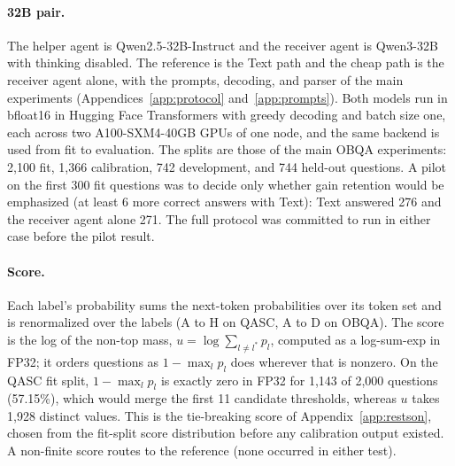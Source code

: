 \paragraph{32B pair.} The helper agent is Qwen2.5-32B-Instruct and the receiver agent is Qwen3-32B with thinking disabled. The reference is the Text path and the cheap path is the receiver agent alone, with the prompts, decoding, and parser of the main experiments (Appendices~\ref{app:protocol} and~\ref{app:prompts}). Both models run in bfloat16 in Hugging Face Transformers with greedy decoding and batch size one, each across two A100-SXM4-40GB GPUs of one node, and the same backend is used from fit to evaluation. The splits are those of the main OBQA experiments: 2,100 fit, 1,366 calibration, 742 development, and 744 held-out questions. A pilot on the first 300 fit questions was to decide only whether gain retention would be emphasized (at least 6 more correct answers with Text): Text answered 276 and the receiver agent alone 271. The full protocol was committed to run in either case before the pilot result.

\paragraph{Score.} Each label's probability sums the next-token probabilities over its token set and is renormalized over the labels (A to H on QASC, A to D on OBQA). The score is the log of the non-top mass, $u=\log\sum_{l\ne l^\ast}p_l$, computed as a log-sum-exp in FP32; it orders questions as $1-\max_l p_l$ does wherever that is nonzero. On the QASC fit split, $1-\max_l p_l$ is exactly zero in FP32 for 1,143 of 2,000 questions (57.15\%), which would merge the first 11 candidate thresholds, whereas $u$ takes 1,928 distinct values. This is the tie-breaking score of Appendix~\ref{app:restson}, chosen from the fit-split score distribution before any calibration output existed. A non-finite score routes to the reference (none occurred in either test).

